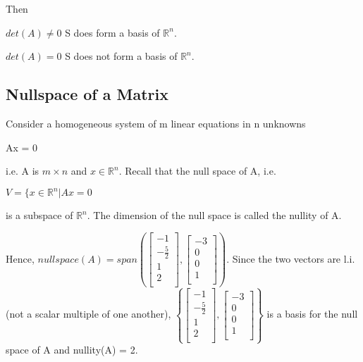 \documentclass{extarticle}
\begin{document}
\begin{multicols}{2}
\begin{tcolorbox}[enhanced jigsaw,sharp corners,coltext=black,colback=BurntOrange!25!white,boxrule=0pt,breakable,size=minimal]
Then

$det(A) \neq 0$ S does form a basis of ${\mathbb{R}}^n$.

$det(A) = 0$ S does not form a basis of ${\mathbb{R}}^n$.

\end{tcolorbox}



\subsection{Nullspace of a Matrix}
Consider a homogeneous system of m linear equations in n unknowns

Ax = 0

i.e. A is $m \times n$ and $x \in {\mathbb{R}}^n$. Recall that the null space of A, i.e.

$V = \{ x \in {\mathbb{R}}^n | Ax = 0$

is a subspace of ${\mathbb{R}}^n$. The dimension of the null space is called the nullity of A.

\begin{tcolorbox}[enhanced jigsaw,sharp corners,coltext=black,colback=BurntOrange!25!white,boxrule=0pt,breakable,size=minimal]

Hence, $null space(A) = span \left( \left[ \begin{matrix} -1\\-\frac{5}{2}\\1\\2\\\end{matrix} \right], \left[ \begin{matrix} -3\\0\\0\\1\\ \end{matrix} \right] \right)$. Since the two vectors are l.i. (not a scalar multiple of one another), $\left\{ \left[ \begin{matrix} -1\\-\frac{5}{2}\\1\\2\\\end{matrix} \right], \left[ \begin{matrix} -3\\0\\0\\1\\ \end{matrix} \right] \right\}$ is a basis for the null space of A and nullity(A) = 2.



\end{tcolorbox}
\end{multicols}
\end{document}
